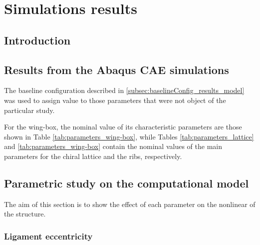 \chapter{Simulations results} \label{chap:Results_sim}

\section{Introduction} \label{sec:intro_Results_sim}


\section{Results from the Abaqus CAE simulations} \label{sec:computationalParametricStudy_Results}

The baseline configuration described in \ref{subsec:baselineConfig_results_model} was used to assign value to those parameters that were not object of the particular study.

For the wing-box, the nominal value of its characteristic parameters are those shown in Table \ref{tab:parameters_wing-box}, while Tables \ref{tab:parameters_lattice} and \ref{tab:parameters_wing-box} contain the nominal values of the main parameters for the chiral lattice and the ribs, respectively.

\section{Parametric study on the computational model} \label{sec:computationalParametricStudy_Results_sim}
%
The aim of this section is to show the effect of each parameter on the nonlinear of the structure.

\subsection{Ligament eccentricity} \label{subsec:eccen_para}

